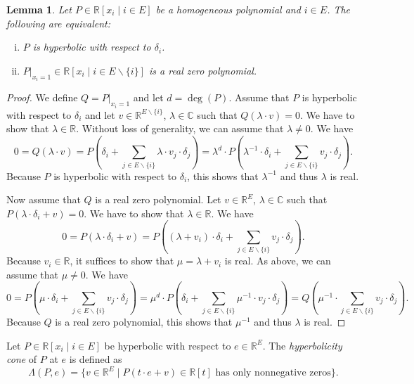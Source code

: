 \documentclass[11pt]{article}
\newtheorem{lem}[theo]{Lemma}
\theoremstyle{definition}
\numberwithin{equation}{section}
\newcommand{\R}{{\mathbb R}}
\newcommand{\C}{{\mathbb C}}
\begin{document}
\begin{lem}
    Let $P\in\R[x_i\mid i\in E]$ be a homogeneous polynomial and $i\in E$. The following are equivalent:
    \begin{enumerate}[(i)]
        \item $P$ is hyperbolic with respect to $\delta_i$.
        \item $P|_{x_i=1}\in\R[x_i\mid i\in E\smallsetminus\{i\}]$ is a real zero polynomial.
    \end{enumerate}
\end{lem}

\begin{proof}
    We define $Q=P|_{x_i=1}$ and let $d=\deg(P)$.
    Assume that $P$ is hyperbolic with respect to $\delta_i$ and let $v\in\R^{E\smallsetminus\{i\}}$, $\lambda\in\C$ such that $Q(\lambda\cdot v)=0$. We have to show that $\lambda\in\R$. Without loss of generality, we can assume that $\lambda\neq0$. We have
    \begin{equation*}
        0=Q(\lambda\cdot v)=P(\delta_i+\sum_{j\in E\smallsetminus\{i\}}\lambda\cdot v_j\cdot \delta_j)=\lambda^d\cdot P(\lambda^{-1}\cdot\delta_i+\sum_{j\in E\smallsetminus\{i\}}v_j\cdot \delta_j).
    \end{equation*}
    Because $P$ is hyperbolic with respect to $\delta_i$, this shows that $\lambda^{-1}$ and thus $\lambda$ is real.

    Now assume that $Q$ is a real zero polynomial. Let $v\in\R^E$, $\lambda\in\C$ such that $P(\lambda\cdot \delta_i+v)=0$. We have to show that $\lambda\in\R$. We have
    \begin{equation*}
        0=P(\lambda\cdot \delta_i+v)=P((\lambda+v_i)\cdot\delta_i+\sum_{j\in E\smallsetminus\{i\}} v_j\cdot \delta_j).
    \end{equation*}
    Because $v_i\in\R$, it suffices to show that $\mu=\lambda+v_i$ is real. As above, we can assume that $\mu\neq0$. We have
    \begin{equation*}
        0=P(\mu\cdot\delta_i+\sum_{j\in E\smallsetminus\{i\}} v_j\cdot \delta_j)=\mu^{d}\cdot P(\delta_i+\sum_{j\in E\smallsetminus\{i\}} \mu^{-1}\cdot v_j\cdot \delta_j)=Q(\mu^{-1}\cdot\sum_{j\in E\smallsetminus\{i\}} v_j\cdot \delta_j).
    \end{equation*}
    Because $Q$ is a real zero polynomial, this shows that $\mu^{-1}$ and thus $\lambda$ is real.
\end{proof}

\begin{Def}
    Let $P\in\R[x_i\mid i\in E]$ be hyperbolic with respect to $e\in\R^E$. The \emph{hyperbolicity cone} of $P$ at $e$ is defined as
    \begin{equation*}
        \Lambda(P,e)=\{v\in\R^E\mid P(t\cdot e+v)\in\R[t]\textrm{ has only nonnegative zeros}\}.
    \end{equation*}
\end{Def}
\end{document}
